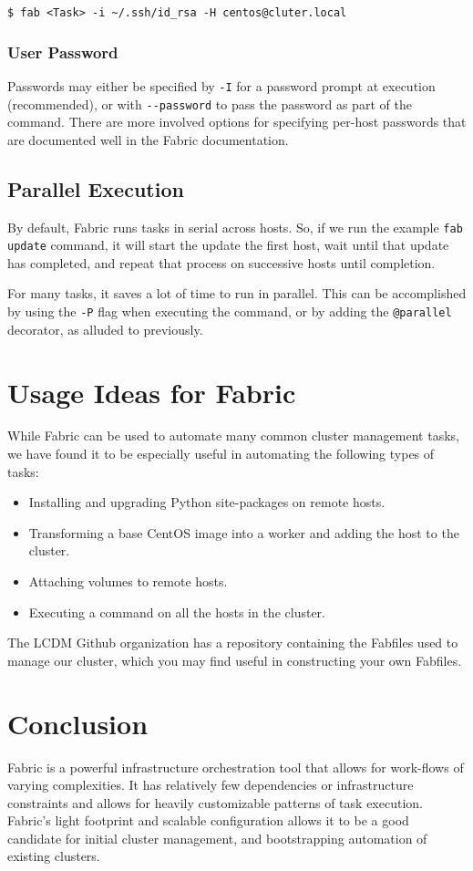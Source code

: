 \documentclass[9pt,twocolumn,twoside]{idsi}
\begin{document}
\begin{verbatim}
$ fab <Task> -i ~/.ssh/id_rsa -H centos@cluter.local
\end{verbatim}

\subsubsection{User Password}
Passwords may either be specified by \texttt{-I} for a password prompt at execution (recommended), or with \texttt{-\--password} to pass the password as part of the command. There are more involved options for specifying per-host passwords that are documented well in the Fabric documentation.

\subsection{Parallel Execution}
By default, Fabric runs tasks in serial across hosts. So, if we run the example \texttt{fab update} command, it will start the update the first host, wait until that update has completed, and repeat that process on successive hosts until completion.

For many tasks, it saves a lot of time to run in parallel. This can be accomplished by using the \texttt{-P} flag when executing the command, or by adding the \texttt{@parallel} decorator, as alluded to previously.

\section{Usage Ideas for Fabric}
While Fabric can be used to automate many common cluster management tasks, we have found it to be especially useful in automating the following types of tasks:
\begin{itemize}
  \item Installing and upgrading Python site-packages on remote hosts.
  \item Transforming a base CentOS image into a worker and adding the host to the cluster.
  \item Attaching volumes to remote hosts.
  \item Executing a command on all the hosts in the cluster.
\end{itemize}
The LCDM Github organization has a repository containing the Fabfiles used to manage our cluster, which you may find useful in constructing your own Fabfiles.

\section{Conclusion}
Fabric is a powerful infrastructure orchestration tool that allows for work-flows of varying complexities. It has relatively few dependencies or infrastructure constraints and allows for heavily customizable patterns of task execution. Fabric's light footprint and scalable configuration allows it to be a good candidate for initial cluster management, and bootstrapping automation of existing clusters.
\end{document}
